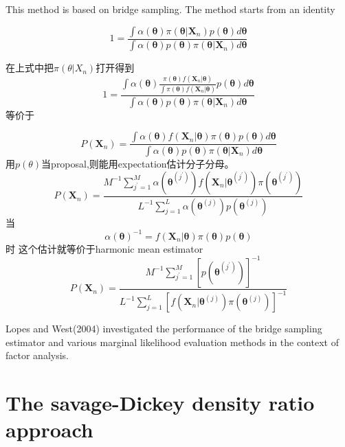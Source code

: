 \documentclass[
]{book}
\theoremstyle{definition}
\theoremstyle{definition}
\theoremstyle{definition}
\theoremstyle{remark}
\begin{document}
This method is based on bridge sampling. The method starts from an identity

\[
1=\frac{\int \alpha(\boldsymbol{\theta}) \pi\left(\boldsymbol{\theta} | \boldsymbol{X}_{n}\right) p(\boldsymbol{\theta}) d \boldsymbol{\theta}}{\int \alpha(\boldsymbol{\theta}) p(\boldsymbol{\theta}) \pi\left(\boldsymbol{\theta} | \boldsymbol{X}_{n}\right) d \boldsymbol{\theta}}
\]

在上式中把\(\pi(\theta|X_n)\)打开得到
\[
1=\frac{\int \alpha(\boldsymbol{\theta}) \frac{\pi\left(\boldsymbol{\theta}\right)f\left(\boldsymbol{X}_{n}|\boldsymbol{\theta}\right)}{\int \pi\left(\boldsymbol{\theta}\right)f\left(\boldsymbol{X}_{n}|\boldsymbol{\theta}\right)}
 p(\boldsymbol{\theta}) d \boldsymbol{\theta}}{\int \alpha(\boldsymbol{\theta}) p(\boldsymbol{\theta}) \pi\left(\boldsymbol{\theta} | \boldsymbol{X}_{n}\right) d \boldsymbol{\theta}}
\]
等价于

\[
P\left(\boldsymbol{X}_{n}\right)=\frac{\int \alpha(\boldsymbol{\theta}) f\left(\boldsymbol{X}_{n} | \boldsymbol{\theta}\right) \pi(\boldsymbol{\theta}) p(\boldsymbol{\theta}) d \boldsymbol{\theta}}{\int \alpha(\boldsymbol{\theta}) p(\boldsymbol{\theta}) \pi\left(\boldsymbol{\theta} | \boldsymbol{X}_{n}\right) d \boldsymbol{\theta}}
\]
用\(p(\theta)\)当proposal,则能用expectation估计分子分母。
\[
P\left(\boldsymbol{X}_{n}\right)=\frac{M^{-1} \sum_{j^{\prime}=1}^{M} \alpha\left(\boldsymbol{\theta}^{\left(j^{\prime}\right)}\right) f\left(\boldsymbol{X}_{n} | \boldsymbol{\theta}^{\left(j^{\prime}\right)}\right) \pi\left(\boldsymbol{\theta}^{\left(j^{\prime}\right)}\right)}{L^{-1} \sum_{j=1}^{L} \alpha\left(\boldsymbol{\theta}^{(j)}\right) p\left(\boldsymbol{\theta}^{(j)}\right)}
\]
当
\[
\alpha(\boldsymbol{\theta})^{-1}=f\left(\boldsymbol{X}_{n} | \boldsymbol{\theta}\right) \pi(\boldsymbol{\theta}) p(\boldsymbol{\theta})
\]
时
这个估计就等价于harmonic mean estimator
\[
P\left(\boldsymbol{X}_{n}\right)=\frac{M^{-1} \sum_{j^{\prime}=1}^{M}\left[p\left(\boldsymbol{\theta}^{\left(j^{\prime}\right)}\right)\right]^{-1}}{L^{-1} \sum_{j=1}^{L}\left[f\left(\boldsymbol{X}_{n} | \boldsymbol{\theta}^{(j)}\right) \pi\left(\boldsymbol{\theta}^{(j)}\right)\right]^{-1}}
\]

Lopes and West(2004) investigated the performance of the bridge sampling estimator and various marginal likelihood evaluation methods in the context of factor analysis.

\hypertarget{the-savage-dickey-density-ratio-approach}{%
\section{The savage-Dickey density ratio approach}\label{the-savage-dickey-density-ratio-approach}}
\end{document}
